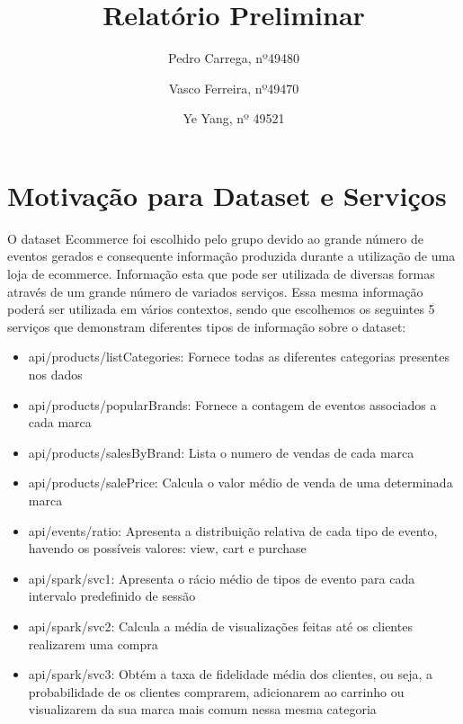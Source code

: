 \documentclass[11pt,a4paper]{article}
\begin{document}
\title{Relatório Preliminar}
\author{Pedro Carrega, nº49480 \and
Vasco Ferreira, nº49470 \and Ye Yang, nº 49521
}


\maketitle

\renewcommand*\contentsname{Indíce}
\tableofcontents
\newpage

\section{Motivação para Dataset e Serviços}

O dataset Ecommerce foi escolhido pelo grupo devido ao grande número de eventos gerados e consequente informação produzida durante a utilização de uma loja de ecommerce. Informação esta que pode ser utilizada de diversas formas através de um grande número de variados serviços. Essa mesma informação poderá ser utilizada em vários contextos, sendo que escolhemos os seguintes 5 serviços que demonstram diferentes tipos de informação sobre o dataset:

\begin{itemize}
  \item api/products/listCategories: Fornece todas as diferentes categorias presentes nos dados
  \item api/products/popularBrands: Fornece a contagem de eventos associados a cada marca
  \item api/products/salesByBrand: Lista o numero de vendas de cada marca
  \item api/products/salePrice: Calcula o valor médio de venda de uma determinada marca
  \item api/events/ratio: Apresenta a distribuição relativa de cada tipo de evento, havendo os possíveis valores: view, cart e purchase
  \item api/spark/svc1: Apresenta o rácio médio de tipos de evento para cada intervalo predefinido de sessão
  \item api/spark/svc2: Calcula a média de visualizações feitas até os clientes realizarem uma compra
  \item api/spark/svc3: Obtém a taxa de fidelidade média dos clientes, ou seja, a probabilidade de os clientes comprarem, adicionarem ao carrinho ou visualizarem da sua marca mais comum nessa mesma categoria
\end{itemize}
\end{document}
